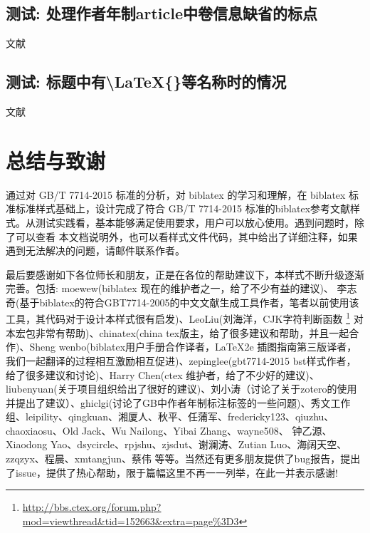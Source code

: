 \subsection{测试: 处理作者年制article中卷信息缺省的标点}\label{sec:article:novol}
\begin{refsection}
文献\cite{刘彻东1998-38-39}\cite{亚洲地质图编目组1978-194-208}
\cite{高光明1998-60-65}

\printbibliography[heading=subbibliography,title=【author-year style:article without volume】]
\end{refsection}

\subsection{测试: 标题中有\textbackslash LaTeX\{\}等名称时的情况}\label{sec:with:latex}
\begin{refsection}
文献\cite{Peebles2001-100-100}\cite{赵凯华1995--}\cite{蒋有绪1998--}

\printbibliography[heading=subbibliography,title=【title with \textbackslash LaTeX\{\}】]
\end{refsection}


\section{总结与致谢}

通过对 GB/T 7714-2015 标准的分析，对 biblatex 的学习和理解，在 biblatex 标准标准样式基础上，设计完成了符合 GB/T 7714-2015 标准的biblatex参考文献样式。从测试实践看，基本能够满足使用要求，用户可以放心使用。遇到问题时，除了可以查看
本文档说明外，也可以看样式文件代码，其中给出了详细注释，如果遇到无法解决的问题，请邮件联系作者。


最后要感谢如下各位师长和朋友，正是在各位的帮助建议下，本样式不断升级逐渐完善。包括: moewew(biblatex 现在的维护者之一，给了不少有益的建议)、 李志奇(基于biblatex的符合GBT7714-2005的中文文献生成工具作者，笔者以前使用该工具，其代码对于设计本样式很有启发)、LeoLiu(刘海洋，CJK字符判断函数
\footnote{\url{http://bbs.ctex.org/forum.php?mod=viewthread&tid=152663&extra=page\%3D3}} 对本宏包非常有帮助)、chinatex(china tex版主，给了很多建议和帮助，并且一起合作)、Sheng wenbo(biblatex用户手册合作译者，LaTeX2e 插图指南第三版译者，我们一起翻译的过程相互激励相互促进)、zepinglee(gbt7714-2015 bst样式作者，给了很多建议和讨论)、Harry Chen(ctex 维护者，给了不少好的建议)、liubenyuan(关于项目组织给出了很好的建议)、刘小涛（讨论了关于zotero的使用并提出了建议）、ghiclgi(讨论了GB中作者年制标注标签的一些问题)、秀文工作组、leipility、qingkuan、湘厦人、秋平、任蒲军、fredericky123、qiuzhu、chaoxiaosu、Old Jack、Wu Nailong、Yibai Zhang、wayne508、 钟乙源、Xiaodong Yao、dsycircle、rpjshu、zjsdut、谢澜涛、Zutian Luo、海阔天空、zzqzyx、程晨、xmtangjun、蔡伟 等等。当然还有更多朋友提供了bug报告，提出了issue，提供了热心帮助，限于篇幅这里不再一一列举，在此一并表示感谢!


